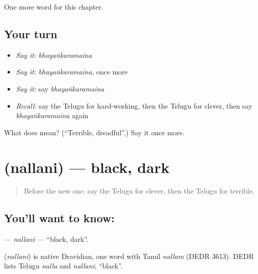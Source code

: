 \begin{grammarlens}[title={What you've built}]
One more word for this chapter.
\end{grammarlens}

\subsection*{Your turn}
\begin{itemize}
\raggedright
  \item \emph{Say it:} \emph{bhayaṅkaramaina}
  \item \emph{Say it:} \emph{bhayaṅkaramaina}, once more
  \item \emph{Say it:} say \emph{bhayaṅkaramaina}
  \item \emph{Recall:} say the Telugu for hard-working, then the Telugu for clever, then say \emph{bhayaṅkaramaina} again
\end{itemize}

\begin{tcolorbox}[breakable,colback=teal!4,colframe=teal!35!black,title={Before you move on}]
What does  mean? (\textquotedblleft{}Terrible, dreadful\textquotedblright{}.) Say it once more.
\end{tcolorbox}
\section[\texorpdfstring{\te{నల్లని} (nallani)}{నల్లని (nallani)}]{ (nallani) — black, dark}

\label{lesson:TE-C142-nallani}



\begin{quote}
Before the new one: say the Telugu for clever, then the Telugu for terrible.
\end{quote}

\subsection*{You'll want to know: }
\textbf{} — \emph{nallani} — \textquotedblleft{}black, dark\textquotedblright{}.

\begin{cousinweb}
\textbf{} (\emph{nallani}) is native Dravidian, one word with Tamil \emph{nallam} (DEDR 3613). DEDR lists Telugu \emph{nalla} and \emph{nallani}, \textquotedblleft{}black\textquotedblright{}.
\end{cousinweb}

